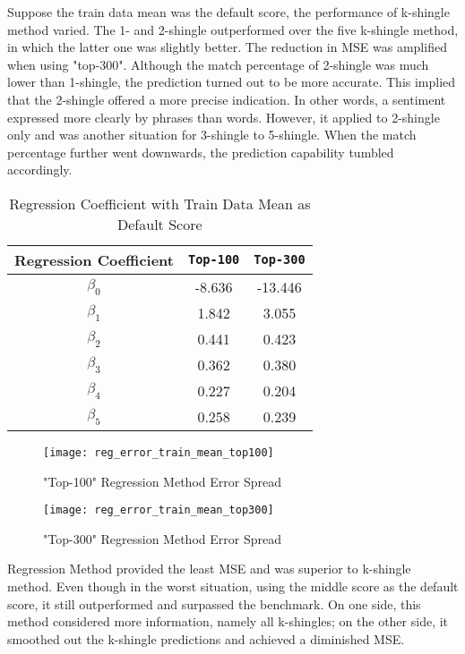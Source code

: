 Suppose the train data mean was the default score, the performance of k-shingle method varied. The 1- and 2-shingle outperformed over the five k-shingle method, in which the latter one was slightly better. The reduction in MSE was amplified when using "top-300". Although the match percentage of 2-shingle was much lower than 1-shingle, the prediction turned out to be more accurate. This implied that the 2-shingle offered a more precise indication. In other words, a sentiment expressed more clearly by phrases than words.
However, it applied to 2-shingle only and was another situation for 3-shingle to 5-shingle. When the match percentage further went downwards, the prediction capability tumbled accordingly. \\

\begin{table}[H]

\caption{Regression Coefficient with Train Data Mean as Default Score}
	\begin{tabular}{ccc}
			\toprule
				Regression Coefficient & \texttt{Top-100} &  \texttt{Top-300} \\
			\midrule
				 $\beta_0$ & -8.636 & -13.446\\
				 $\beta_1$ & 1.842 & 3.055\\
				 $\beta_2$ & 0.441 & 0.423\\
				 $\beta_3$ & 0.362 & 0.380\\
				 $\beta_4$ & 0.227 & 0.204\\
				 $\beta_5$ & 0.258 & 0.239\\
				

			\bottomrule
		\end{tabular}

\end{table}

\begin{figure}
\texttt{[image: reg\_error\_train\_mean\_top100]}
\caption{"Top-100" Regression Method Error Spread}
\end{figure}

\begin{figure}
\texttt{[image: reg\_error\_train\_mean\_top300]}
\caption{"Top-300" Regression Method Error Spread}
\end{figure}


Regression Method provided the least MSE and was superior to k-shingle method. Even though in the worst situation, using the middle score as the default score, it still outperformed and surpassed the benchmark. On one side, this method considered more information, namely all k-shingles; on the other side, it smoothed out the k-shingle predictions and achieved a diminished MSE.\\

